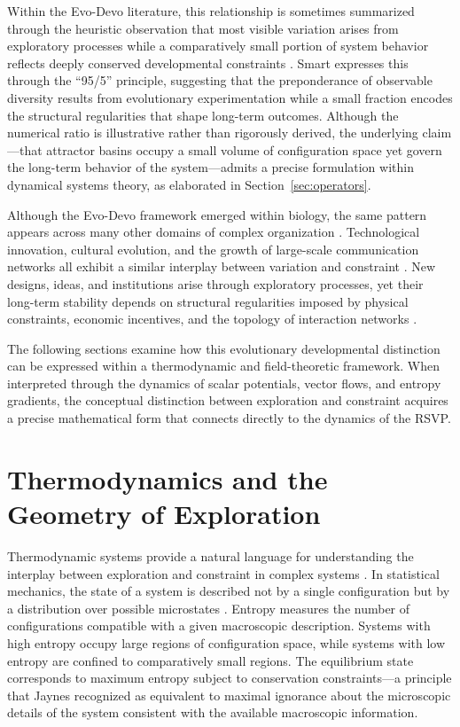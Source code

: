\documentclass[12pt]{article}
\begin{document}
Within the Evo-Devo literature, this relationship is sometimes summarized through the heuristic observation that most visible variation arises from exploratory processes while a comparatively small portion of system behavior reflects deeply conserved developmental constraints \cite{smart2009}. Smart expresses this through the ``95/5'' principle, suggesting that the preponderance of observable diversity results from evolutionary experimentation while a small fraction encodes the structural regularities that shape long-term outcomes. Although the numerical ratio is illustrative rather than rigorously derived, the underlying claim---that attractor basins occupy a small volume of configuration space yet govern the long-term behavior of the system---admits a precise formulation within dynamical systems theory, as elaborated in Section~\ref{sec:operators}.

Although the Evo-Devo framework emerged within biology, the same pattern appears across many other domains of complex organization \cite{gellmann1994,mitchell2009}. Technological innovation, cultural evolution, and the growth of large-scale communication networks all exhibit a similar interplay between variation and constraint \cite{barabasi2016,smart2023}. New designs, ideas, and institutions arise through exploratory processes, yet their long-term stability depends on structural regularities imposed by physical constraints, economic incentives, and the topology of interaction networks \cite{bak1996,barabasi2016}.

The following sections examine how this evolutionary developmental distinction can be expressed within a thermodynamic and field-theoretic framework. When interpreted through the dynamics of scalar potentials, vector flows, and entropy gradients, the conceptual distinction between exploration and constraint acquires a precise mathematical form that connects directly to the dynamics of the RSVP.

\section{Thermodynamics and the Geometry of Exploration}
\label{sec:thermo}

Thermodynamic systems provide a natural language for understanding the interplay between exploration and constraint in complex systems \cite{prigogine1984,jaynes1957}. In statistical mechanics, the state of a system is described not by a single configuration but by a distribution over possible microstates \cite{jaynes1957,cover2006}. Entropy measures the number of configurations compatible with a given macroscopic description. Systems with high entropy occupy large regions of configuration space, while systems with low entropy are confined to comparatively small regions. The equilibrium state corresponds to maximum entropy subject to conservation constraints---a principle that Jaynes \cite{jaynes1957} recognized as equivalent to maximal ignorance about the microscopic details of the system consistent with the available macroscopic information.
\end{document}
